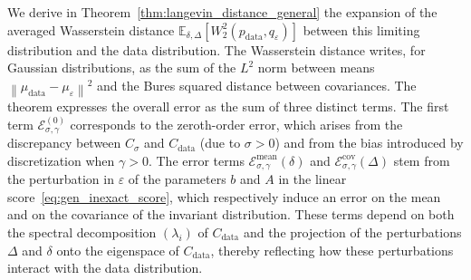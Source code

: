 \documentclass[11pt]{article}
\newcommand{\norm}[1]{\left\|{#1}\right\|}
\newcommand{\tr}[1]{\operatorname{Tr}\left({#1}\right)}
\newcommand{\sh}[1]{{\color{red}{#1}}}
\newcommand{\EE}{\mathbb{E}}
\begin{document}
We derive in Theorem~\ref{thm:langevin_distance_general} the expansion of the averaged Wasserstein distance $\EE_{\delta, \Delta}  \left[ W_2^2(p_\mathrm{data},q_\varepsilon) \right]$
between this limiting distribution and the data distribution. The Wasserstein distance writes, for Gaussian distributions, as the sum of the $L^2$ norm between means $\norm{\mu_\mathrm{data} - \mu_\varepsilon}^2$ and the Bures squared distance between covariances. 
The theorem expresses the overall error as the sum of three distinct terms. The first term $\mathcal{E}^{(0)}_{\sigma, \gamma}$ corresponds to the zeroth-order error, which arises from the discrepancy between \(C_\sigma\) and \(C_{\mathrm{data}}\) (due to $\sigma>0$) and from the bias introduced by discretization when \(\gamma > 0\).  The error terms $\mathcal{E}_{\sigma, \gamma}^{\text{mean}}(\delta)$ and $\mathcal{E}_{\sigma, \gamma}^{\text{cov}}(\Delta)$ stem from the perturbation in $\varepsilon$ of the parameters $b$ and $A$ in the linear score~\eqref{eq:gen_inexact_score}, which respectively induce an error on the mean and on the covariance of the invariant distribution. These terms depend on both the spectral decomposition $(\lambda_i)$ of \(C_{\mathrm{data}}\) and the projection of the perturbations $\Delta$ and $\delta$ onto the eigenspace of \(C_{\mathrm{data}}\), thereby reflecting how these perturbations interact with the data distribution.
\end{document}
